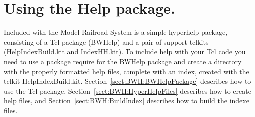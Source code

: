 
\chapter{Using the Help package.}
\label{chapt:BWHelp}

Included with the Model Railroad System is a simple hyperhelp package,
consisting of a Tcl package (BWHelp) and a pair of support tclkits
(HelpIndexBuild.kit and IndexHH.kit).  To include help with your Tcl
code you need to use a package require for the BWHelp package and
create a directory with the properly formatted help files, complete
with an index, created with the tclkit HelpIndexBuild.kit. 
Section~\ref{sect:BWH:BWHelpPackage} describes how to use the Tcl
package, Section~\ref{sect:BWH:HyperHelpFiles} describes how to create
help files, and Section~\ref{sect:BWH:BuildIndex} describes how to build
the indexe files.


